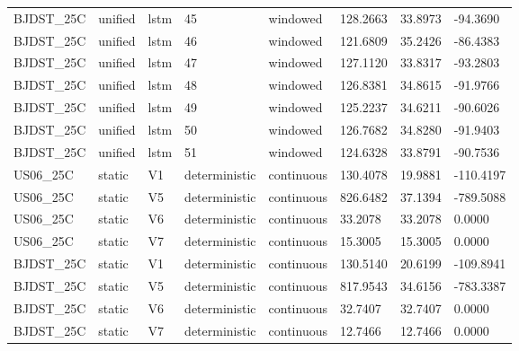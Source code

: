 \begin{tabular}{llllllll}
BJDST\_25C & unified & lstm & 45 & windowed & 128.2663 & 33.8973 & -94.3690 \\
BJDST\_25C & unified & lstm & 46 & windowed & 121.6809 & 35.2426 & -86.4383 \\
BJDST\_25C & unified & lstm & 47 & windowed & 127.1120 & 33.8317 & -93.2803 \\
BJDST\_25C & unified & lstm & 48 & windowed & 126.8381 & 34.8615 & -91.9766 \\
BJDST\_25C & unified & lstm & 49 & windowed & 125.2237 & 34.6211 & -90.6026 \\
BJDST\_25C & unified & lstm & 50 & windowed & 126.7682 & 34.8280 & -91.9403 \\
BJDST\_25C & unified & lstm & 51 & windowed & 124.6328 & 33.8791 & -90.7536 \\
US06\_25C & static & V1 & deterministic & continuous & 130.4078 & 19.9881 & -110.4197 \\
US06\_25C & static & V5 & deterministic & continuous & 826.6482 & 37.1394 & -789.5088 \\
US06\_25C & static & V6 & deterministic & continuous & 33.2078 & 33.2078 & 0.0000 \\
US06\_25C & static & V7 & deterministic & continuous & 15.3005 & 15.3005 & 0.0000 \\
BJDST\_25C & static & V1 & deterministic & continuous & 130.5140 & 20.6199 & -109.8941 \\
BJDST\_25C & static & V5 & deterministic & continuous & 817.9543 & 34.6156 & -783.3387 \\
BJDST\_25C & static & V6 & deterministic & continuous & 32.7407 & 32.7407 & 0.0000 \\
BJDST\_25C & static & V7 & deterministic & continuous & 12.7466 & 12.7466 & 0.0000 \\
\hline
\end{tabular}
